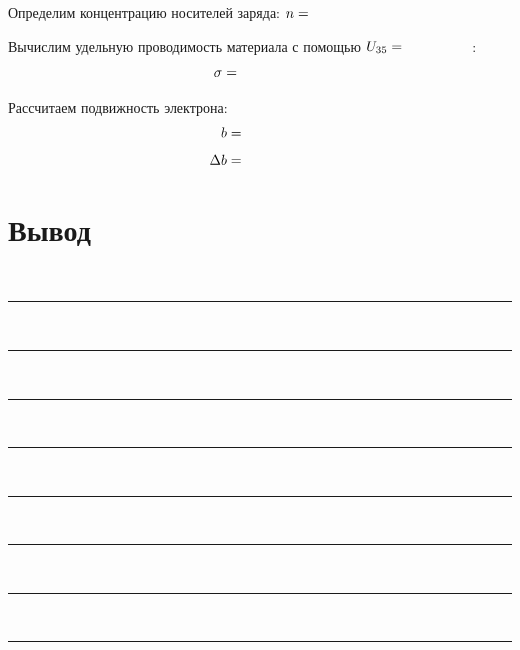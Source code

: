 \documentclass{physlab}
\begin{document}
Определим концентрацию носителей заряда: $n = \val$
	
Вычислим удельную проводимость материала с помощью $U_{35}=\val$:
\[\sigma=\val\]

Рассчитаем подвижность электрона:
\begin{align*}
b &= \val \\[1ex]
\Delta b &=\val
\end{align*}


\section{Вывод}

~\\[-1ex]\hrule~\\[1ex]\hrule~\\[1ex]\hrule~\\[1ex]\hrule~\\[1ex]\hrule~\\[1ex]\hrule~\\[1ex]\hrule~\\[1ex]\hrule
\end{document}
